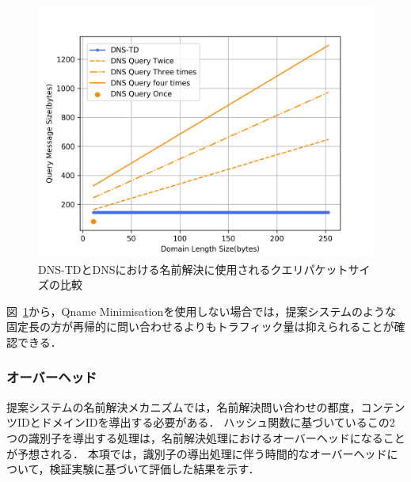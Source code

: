 \begin{figure}[htbp]
 \centering
 \includegraphics[scale=0.4]{figure/length-size.png}
 \caption[DNSと提案システムのクエリパケットサイズ比較]{DNS-TDとDNSにおける名前解決に使用されるクエリパケットサイズの比較}
 \label{fig:length-size}
\end{figure}


図~\ref{fig:length-size}から，Qname Minimisationを使用しない場合では，提案システムのような固定長の方が再帰的に問い合わせるよりもトラフィック量は抑えられることが確認できる．

%


\subsubsection{オーバーヘッド}
提案システムの名前解決メカニズムでは，名前解決問い合わせの都度，コンテンツIDとドメインIDを導出する必要がある．
ハッシュ関数に基づいているこの2つの識別子を導出する処理は，名前解決処理におけるオーバーヘッドになることが予想される．
本項では，識別子の導出処理に伴う時間的なオーバーヘッドについて，検証実験に基づいて評価した結果を示す．

